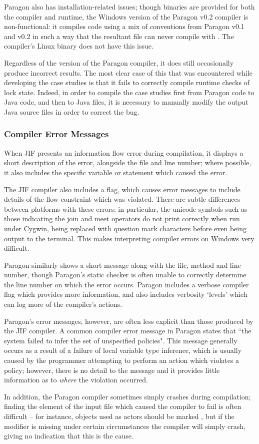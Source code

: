 Paragon also has installation-related issues; though binaries are provided for both the compiler and runtime, the Windows version of the Paragon v0.2 compiler is non-functional: it compiles code using a mix of conventions from Paragon v0.1 and v0.2 in such a way that the resultant  file can never compile with . The compiler's Linux binary does not have this issue.

Regardless of the version of the Paragon compiler, it does still occasionally produce incorrect results. The most clear case of this that was encountered while developing the case studies is that it fails to correctly compile runtime checks of lock state. Indeed, in order to compile the case studies first from Paragon code to Java code, and then to Java  files, it is necessary to manually modify the output Java source files in order to correct the bug.

\clearpage

\subsubsection{Compiler Error Messages}

When JIF presents an information flow error during compilation, it displays a short description of the error, alongside the file and line number; where possible, it also includes the specific variable or statement which caused the error.

The JIF compiler also includes a  flag, which causes error messages to include details of the flow constraint which was violated. There are subtle differences between platforms with these errors: in particular, the unicode symbols such as those indicating the join and meet operators do not print correctly when run under Cygwin, being replaced with question mark characters before even being output to the terminal. This makes interpreting compiler errors on Windows very difficult.

Paragon similarly shows a short message along with the file, method and line number, though Paragon's static checker is often unable to correctly determine the line number on which the error occurs. Paragon includes a verbose compiler flag which provides more information, and also includes verbosity `levels' which can log more of the compiler's actions.

Paragon's error messages, however, are often less explicit than those produced by the JIF compiler. A common compiler error message in Paragon states that ``the system failed to infer the set of unspecified policies". This message generally occurs as a result of a failure of local variable type inference, which is usually caused by the programmer attempting to perform an action which violates a policy; however, there is no detail to the message and it provides little information as to \textit{where} the violation occurred.

In addition, the Paragon compiler sometimes simply crashes during compilation; finding the element of the input file which caused the compiler to fail is often difficult -- for instance, objects used as actors should be marked , but if the modifier is missing under certain circumstances the compiler will simply crash, giving no indication that this is the cause.